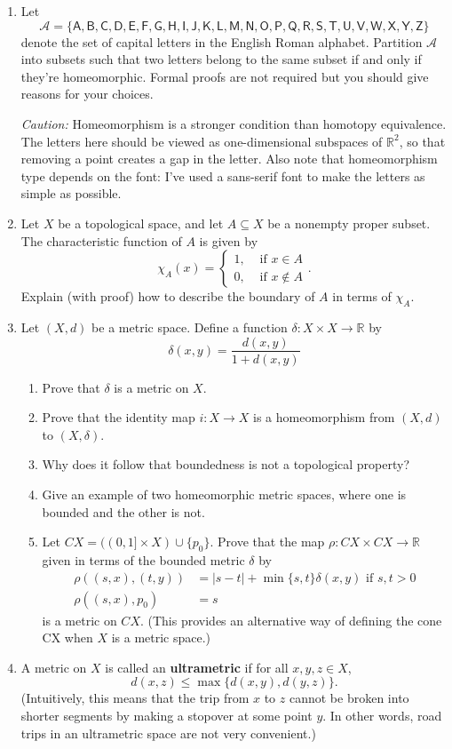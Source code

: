\documentclass[letterpaper,12pt]{article}
\newcommand{\abs}[1]{\lvert #1\rvert}
\newcommand{\R}{\mathbb{R}}
\begin{document}
\begin{enumerate}
\item Let
\[
\mathcal{A} = \{\mathsf{A,B,C,D,E,F,G,H,I,J,K,L,M,N,O,P,Q,R,S,T,U,V,W,X,Y,Z}\}
\]
denote the set of capital letters in the English Roman alphabet. Partition $\mathcal{A}$ into subsets such that two letters belong to the same subset if and only if they're homeomorphic. Formal proofs are not required but you should give reasons for your choices.

{\em Caution:} Homeomorphism is a stronger condition than homotopy equivalence. The letters here should be viewed as one-dimensional subspaces of $\R^2$, so that removing a point creates a gap in the letter. Also note that homeomorphism type depends on the font: I've used a sans-serif font to make the letters as simple as possible.
\item Let $X$ be a topological space, and let $A\subseteq X$ be a nonempty proper subset. The characteristic function of $A$ is given by
\[
\chi_A (x) = \begin{cases} 1, & \text{ if } x\in A\\ 0, & \text{ if } x\notin A\end{cases}.
\]
Explain (with proof) how to describe the boundary of $A$ in terms of $\chi_A$.
\item Let $(X,d)$ be a metric space. Define a function $\delta:X\times X\to\R$ by
\[
\delta(x,y) = \frac{d(x,y)}{1+d(x,y)}
\]
\begin{enumerate}
\item Prove that $\delta$ is a metric on $X$.
\item Prove that the identity map $i:X\to X$ is a homeomorphism from $(X,d)$ to $(X,\delta)$.
\item Why does it follow that boundedness is not a topological property?
\item Give an example of two homeomorphic metric spaces, where one is bounded and the other is not.
\item Let $CX = ((0,1]\times X)\cup \{p_0\}$. Prove that the map $\rho:CX\times CX\to \R$ given in terms of the bounded metric $\delta$ by
\begin{align*}
\rho((s,x),(t,y)) & = \abs{s-t} + \min\{s,t\}\delta(x,y) \text{ if } s,t>0\\
\rho((s,x),p_0) &= s
\end{align*}
is a metric on $CX$. (This provides an alternative way of defining the cone CX when $X$ is a metric space.)
\end{enumerate}
\item A metric on $X$ is called an {\bf ultrametric} if for all $x,y,z\in X$,
\[
d(x,z)\leq \max\{d(x,y),d(y,z)\}.
\]
(Intuitively, this means that the trip from $x$ to $z$ cannot be broken into shorter segments by making a stopover at some point $y$. In other words, road trips in an ultrametric space are not very convenient.)


\end{enumerate}
\end{document}
